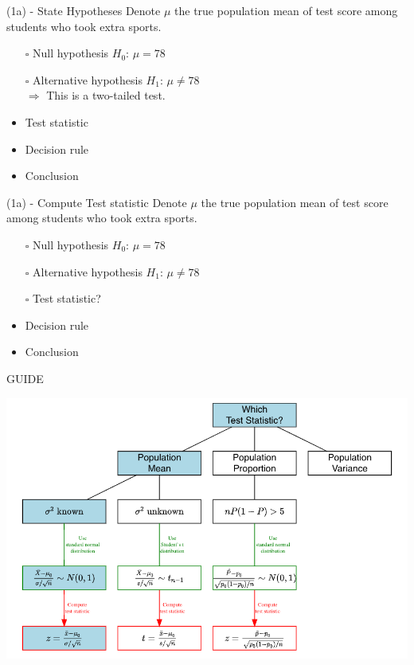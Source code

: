 \documentclass[
  11pt,
  ignorenonframetext,
]{beamer}
\begin{document}
\begin{frame}{(1a) - State Hypotheses}
\protect\hypertarget{a---state-hypotheses-2}{}
Denote \(\mu\) the true population mean of test score among students who
took extra sports.

\begin{itemize}
    \item [$\square$] Null hypothesis $H_0$: $\mu = 78$\\
    \vspace{2mm}
    \item [$\square$] Alternative hypothesis $H_1$: $\mu \neq 78$\\
      $\Rightarrow$ This is a two-tailed test.
    \vspace{2mm}
    \item Test statistic
    \item Decision rule
    \item Conclusion
\end{itemize}
\end{frame}

\begin{frame}{(1a) - Compute Test statistic}
\protect\hypertarget{a---compute-test-statistic}{}
Denote \(\mu\) the true population mean of test score among students who
took extra sports.

\begin{itemize}
    \item [$\square$] Null hypothesis $H_0$: $\mu = 78$\\
    \vspace{2mm}
    \item [$\square$] Alternative hypothesis $H_1$: $\mu \neq 78$\\
    \vspace{2mm}
    \item [$\square$] Test statistic?
    \item Decision rule
    \item Conclusion
\end{itemize}
\end{frame}

\begin{frame}{GUIDE \faMapO}
\protect\hypertarget{guide}{}
\begin{center}\includegraphics[width=0.9\linewidth]{../LAB3-2324/pictures/HypothesisTestsGuide-Case1} \end{center}
\end{frame}
\end{document}
